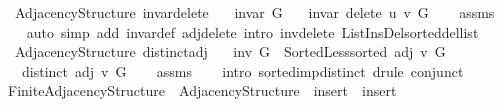 \begin{isabellebody}
\isamarkupfalse%
\ {\isacharparenleft}{\kern0pt}\ Adjacency{\isacharunderscore}{\kern0pt}Structure{\isacharparenright}{\kern0pt}\ invar{\isacharunderscore}{\kern0pt}delete{\isacharcolon}{\kern0pt}\isanewline
\ \ \ {\isachardoublequoteopen}invar\ G{\isachardoublequoteclose}\isanewline
\ \ \ {\isachardoublequoteopen}invar\ {\isacharparenleft}{\kern0pt}delete\ u\ v\ G{\isacharparenright}{\kern0pt}{\isachardoublequoteclose}%
\endisataginvisible
{\isafoldinvisible}%
%
\isadeliminvisible
\isanewline
%
\endisadeliminvisible
%
\isadelimproof
\ \ %
\endisadelimproof
%
\isatagproof
{}\isamarkupfalse%
\ assms\isanewline
\ \ \isamarkupfalse%
\ {\isacharparenleft}{\kern0pt}auto\ simp\ add{\isacharcolon}{\kern0pt}\ invar{\isacharunderscore}{\kern0pt}def\ adj{\isacharunderscore}{\kern0pt}delete\ intro{\isacharcolon}{\kern0pt}\ inv{\isacharunderscore}{\kern0pt}delete\ List{\isacharunderscore}{\kern0pt}Ins{\isacharunderscore}{\kern0pt}Del{\isachardot}{\kern0pt}sorted{\isacharunderscore}{\kern0pt}del{\isacharunderscore}{\kern0pt}list{\isacharparenright}{\kern0pt}%
\endisatagproof
{\isafoldproof}%
%
\isadelimproof
\isanewline
%
\endisadelimproof
%
\isadeliminvisible
\isanewline
%
\endisadeliminvisible
%
\isataginvisible
{}\isamarkupfalse%
\ {\isacharparenleft}{\kern0pt}\ Adjacency{\isacharunderscore}{\kern0pt}Structure{\isacharparenright}{\kern0pt}\ distinct{\isacharunderscore}{\kern0pt}adj{\isacharcolon}{\kern0pt}\isanewline
\ \ \ {\isachardoublequoteopen}inv\ G\ {\isasymand}\ Sorted{\isacharunderscore}{\kern0pt}Less{\isachardot}{\kern0pt}sorted\ {\isacharparenleft}{\kern0pt}adj\ v\ G{\isacharparenright}{\kern0pt}{\isachardoublequoteclose}\isanewline
\ \ \ {\isachardoublequoteopen}distinct\ {\isacharparenleft}{\kern0pt}adj\ v\ G{\isacharparenright}{\kern0pt}{\isachardoublequoteclose}%
\endisataginvisible
{\isafoldinvisible}%
%
\isadeliminvisible
\isanewline
%
\endisadeliminvisible
%
\isadelimproof
\ \ %
\endisadelimproof
%
\isatagproof
{}\isamarkupfalse%
\ assms\isanewline
\ \ \isamarkupfalse%
\ {\isacharparenleft}{\kern0pt}intro\ sorted{\isacharunderscore}{\kern0pt}imp{\isacharunderscore}{\kern0pt}distinct{\isacharparenright}{\kern0pt}\ {\isacharparenleft}{\kern0pt}drule\ conjunct{}{\isacharparenright}{\kern0pt}%
\endisatagproof
{\isafoldproof}%
%
\isadelimproof
\isanewline
%
\endisadelimproof
\isanewline
{}\isamarkupfalse%
\ Finite{\isacharunderscore}{\kern0pt}Adjacency{\isacharunderscore}{\kern0pt}Structure\ {\isacharequal}{\kern0pt}\ Adjacency{\isacharunderscore}{\kern0pt}Structure\ \ insert\ {\isacharequal}{\kern0pt}\ insert\ \isanewline

\end{isabellebody}
